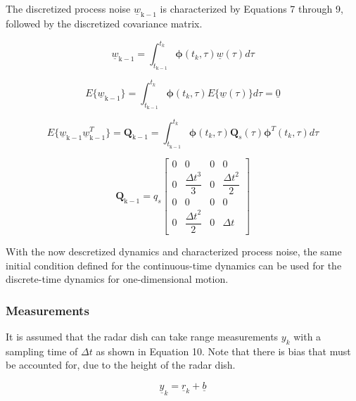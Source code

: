 \documentclass{article}
\begin{document}
The discretized process noise $\underline{w}_\mathrm{k-1}$ is characterized by Equations 7 through 9, followed by the discretized covariance matrix.

\begin{equation}
    \underline{w}_\mathrm{k-1} = \int_{t_\mathrm{k-1}}^{t_k} \boldsymbol{\phi}(t_k, \tau)\underline{w}(\tau)d\tau
\end{equation}

\begin{equation}
    E\{\underline{w}_\mathrm{k-1}\} = \int_{t_\mathrm{k-1}}^{t_k} \boldsymbol{\phi}(t_k, \tau)E\{\underline{w}(\tau)\}d\tau = \underline{0}
\end{equation}

\begin{equation}
    E\{\underline{w}_\mathrm{k-1}\underline{w}_\mathrm{k-1}^T\} = \mathbf{Q}_\mathrm{k-1} = 
    \int_{t_\mathrm{k-1}}^{t_k} \boldsymbol{\phi}(t_k, \tau)\mathbf{Q}_s(\tau)\boldsymbol{\phi}^T(t_k, \tau)d\tau
\end{equation}

\begin{equation*}
    \mathbf{Q}_\mathrm{k-1} = q_s
    \begin{bmatrix}
        0 & 0 & 0 & 0\\
        0 & \dfrac{{\Delta t}^3}{3} & 0 & \dfrac{{\Delta t}^2}{2} \\
        0 & 0 & 0 & 0 \\
        0 & \dfrac{{\Delta t}^2}{2} & 0 & \Delta t
    \end{bmatrix}
\end{equation*}

With the now descretized dynamics and characterized process noise, the same initial condition defined for the continuous-time dynamics can be used for the discrete-time dynamics for one-dimensional motion.

\subsubsection{Measurements}

It is assumed that the radar dish can take range measurements $y_k$ with a sampling time of $\Delta t$ as shown in Equation 10. Note that there is bias that must be accounted for, due to the height of the radar dish.

\begin{equation}
    \underline{y}_k = \underline{r}_k + \underline{b}
\end{equation}
\end{document}

